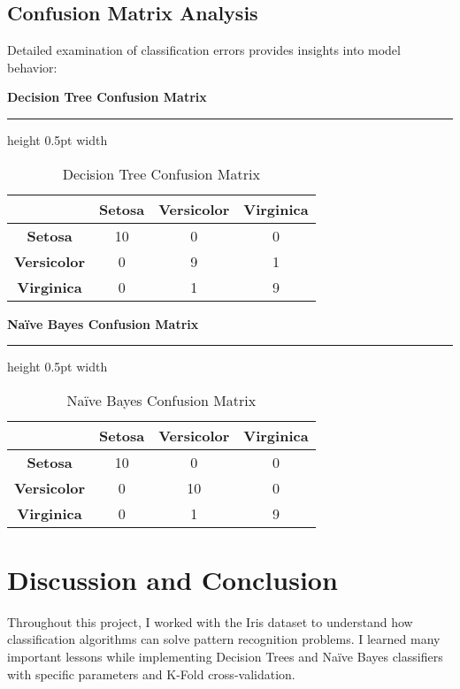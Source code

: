 \documentclass[12pt,a4paper]{article}
\newcommand{\tablealtrow}{\rowcolor{tablealt1}}
\newcommand{\projecttitle}[1]{
    \vspace{12pt}
    {\normalfont\large\bfseries\color{accentblue}#1}
    \vspace{0.5pt}
    {\color{accentblue}\hrule height 0.5pt width \textwidth}
    \vspace{8pt}
}
\begin{document}
\subsection{Confusion Matrix Analysis}

Detailed examination of classification errors provides insights into model behavior:

\projecttitle{Decision Tree Confusion Matrix}

\begin{table}[h!]
\centering
\renewcommand{\arraystretch}{1.3}
\begin{tabular}{|c|c|c|c|}
\hline
\rowcolor{tableheader} & \textcolor{headertext}{\textbf{Setosa}} & \textcolor{headertext}{\textbf{Versicolor}} & \textcolor{headertext}{\textbf{Virginica}} \\
\hline
\tablealtrow \textbf{Setosa} & 10 & 0 & 0 \\
\rowcolor{tablealt2} \textbf{Versicolor} & 0 & 9 & 1 \\
\tablealtrow \textbf{Virginica} & 0 & 1 & 9 \\
\hline
\end{tabular}
\caption{Decision Tree Confusion Matrix}
\end{table}

\projecttitle{Na\"{i}ve Bayes Confusion Matrix}

\begin{table}[h!]
\centering
\renewcommand{\arraystretch}{1.3}
\begin{tabular}{|c|c|c|c|}
\hline
\rowcolor{tableheader} & \textcolor{headertext}{\textbf{Setosa}} & \textcolor{headertext}{\textbf{Versicolor}} & \textcolor{headertext}{\textbf{Virginica}} \\
\hline
\tablealtrow \textbf{Setosa} & 10 & 0 & 0 \\
\rowcolor{tablealt2} \textbf{Versicolor} & 0 & 10 & 0 \\
\tablealtrow \textbf{Virginica} & 0 & 1 & 9 \\
\hline
\end{tabular}
\caption{Na\"{i}ve Bayes Confusion Matrix}
\end{table}

\section{Discussion and Conclusion}

Throughout this project, I worked with the Iris dataset to understand how classification algorithms can solve pattern recognition problems. I learned many important lessons while implementing Decision Trees and Na\"{i}ve Bayes classifiers with specific parameters and K-Fold cross-validation.
\end{document}
